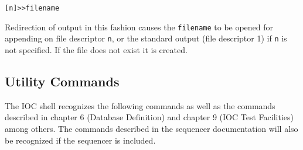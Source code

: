 \begin{verbatim}
[n]>>filename
\end{verbatim}

Redirection of output in this fashion causes the \verb|filename| to be opened for appending on file descriptor \verb|n|, or the standard output (file descriptor 1) if \verb|n| is not specified.
If the file does not exist it is created.

\subsection{Utility Commands}
\label{Utility Commands}

The IOC shell recognizes the following commands as well as the commands described in chapter 6 (Database Definition) and chapter 9 (IOC Test Facilities) among others.
The commands described in the sequencer documentation will also be recognized if the sequencer is included.

